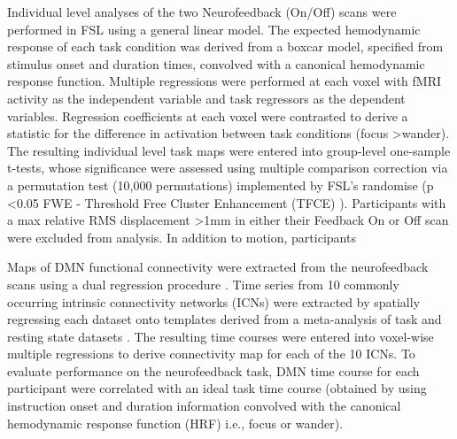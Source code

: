 Individual level analyses of the two Neurofeedback (On/Off) scans were performed in FSL using a general linear model. The expected hemodynamic response of each task condition was derived from a boxcar model, specified from stimulus onset and duration times, convolved with a canonical hemodynamic response function. Multiple regressions were performed at each voxel with fMRI activity as the independent variable and task regressors as the dependent variables. Regression coefficients at each voxel were contrasted to derive a statistic for the difference in activation between task conditions (focus \textgreater wander). The resulting individual level task maps were entered into group-level one-sample t-tests, whose significance were assessed using multiple comparison correction via a permutation test (10,000 permutations) implemented by FSL's randomise (p \textless 0.05 FWE - Threshold Free Cluster Enhancement (TFCE) \cite{Smith_2009b,Winkler_2014,Salimi_Khorshidi_2011}). Participants with a max relative RMS displacement \textgreater 1mm in either their Feedback On or Off scan were excluded from analysis. In addition to motion, participants 

Maps of DMN functional connectivity were extracted from the neurofeedback scans using a dual regression procedure \cite{Filippini_2009}. Time series from 10 commonly occurring intrinsic connectivity networks (ICNs) were extracted by spatially regressing each dataset onto templates derived from a meta-analysis of task and resting state datasets \cite{Smith_2009a}. The resulting time courses were entered into voxel-wise multiple regressions to derive connectivity map for each of the 10 ICNs. To evaluate performance on the neurofeedback task, DMN time course for each participant were correlated with an ideal task time course (obtained by using instruction onset and duration information convolved with the canonical hemodynamic response function (HRF)  i.e., focus or wander).




